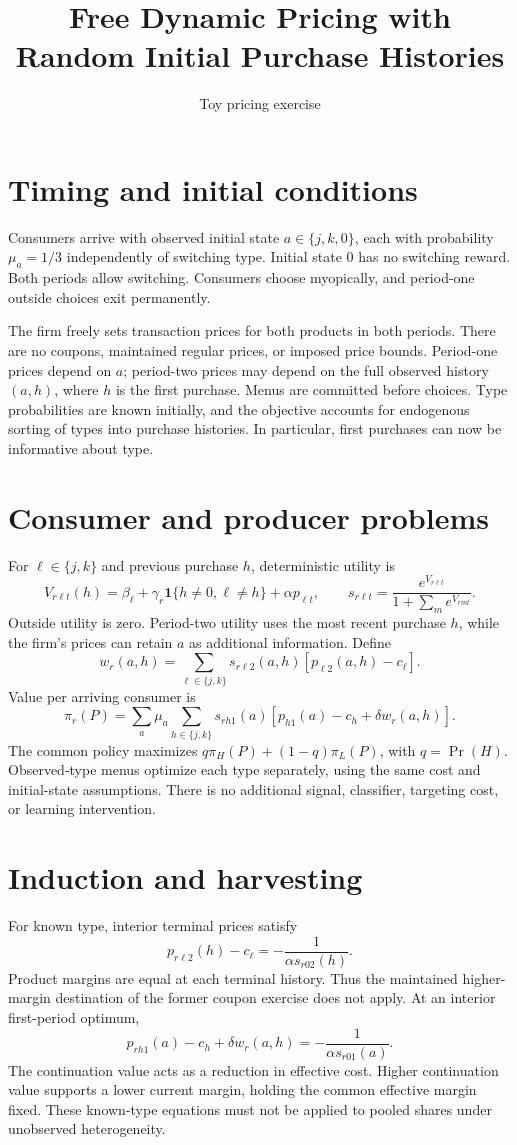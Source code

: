 \documentclass[11pt]{article}
\title{Free Dynamic Pricing with Random Initial Purchase Histories}
\author{Toy pricing exercise}\date{}
\begin{document}
\maketitle
\section{Timing and initial conditions}
Consumers arrive with observed initial state $a\in\{j,k,0\}$, each with probability $\mu_a=1/3$ independently of switching type. Initial state 0 has no switching reward. Both periods allow switching. Consumers choose myopically, and period-one outside choices exit permanently.

The firm freely sets transaction prices for both products in both periods. There are no coupons, maintained regular prices, or imposed price bounds. Period-one prices depend on $a$; period-two prices may depend on the full observed history $(a,h)$, where $h$ is the first purchase. Menus are committed before choices. Type probabilities are known initially, and the objective accounts for endogenous sorting of types into purchase histories. In particular, first purchases can now be informative about type.
\section{Consumer and producer problems}
For $\ell\in\{j,k\}$ and previous purchase $h$, deterministic utility is
\[
V_{r\ell t}(h)=\beta_\ell+\gamma_r\mathbf1\{h\ne0,\ell\ne h\}+\alpha p_{\ell t},
\qquad s_{r\ell t}=\frac{e^{V_{r\ell t}}}{1+\sum_m e^{V_{rmt}}}.
\]
Outside utility is zero. Period-two utility uses the most recent purchase $h$, while the firm's prices can retain $a$ as additional information. Define
\[
w_r(a,h)=\sum_{\ell\in\{j,k\}}s_{r\ell2}(a,h)[p_{\ell2}(a,h)-c_\ell].
\]
Value per arriving consumer is
\[
\pi_r(P)=\sum_a\mu_a\sum_{h\in\{j,k\}}s_{rh1}(a)
[p_{h1}(a)-c_h+\delta w_r(a,h)].
\]
The common policy maximizes $q\pi_H(P)+(1-q)\pi_L(P)$, with $q=\Pr(H)$. Observed-type menus optimize each type separately, using the same cost and initial-state assumptions. There is no additional signal, classifier, targeting cost, or learning intervention.
\section{Induction and harvesting}
For known type, interior terminal prices satisfy
\[
p_{r\ell2}(h)-c_\ell=-\frac{1}{\alpha s_{r02}(h)}.
\]
Product margins are equal at each terminal history. Thus the maintained higher-margin destination of the former coupon exercise does not apply. At an interior first-period optimum,
\[
p_{rh1}(a)-c_h+\delta w_r(a,h)=-\frac{1}{\alpha s_{r01}(a)}.
\]
The continuation value acts as a reduction in effective cost. Higher continuation value supports a lower current margin, holding the common effective margin fixed. These known-type equations must not be applied to pooled shares under unobserved heterogeneity.
\end{document}
